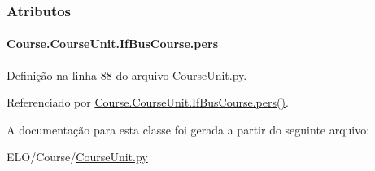 \subsubsection{Atributos}
\hypertarget{classCourse_1_1CourseUnit_1_1IfBusCourse_ab926ae8fb127b7697e2b63025df09a78}{
\paragraph[{pers}]{\setlength{\rightskip}{0pt plus 5cm}Course.\-Course\-Unit.\-If\-Bus\-Course.\-pers}}\label{classCourse_1_1CourseUnit_1_1IfBusCourse_ab926ae8fb127b7697e2b63025df09a78}


Definição na linha \hyperlink{CourseUnit_8py_source_l00088}{88} do arquivo \hyperlink{CourseUnit_8py_source}{Course\-Unit.\-py}.



Referenciado por \hyperlink{classCourse_1_1CourseUnit_1_1IfBusCourse_adf5702dec1a99bbb31936b7f1d425a40}{Course.\-Course\-Unit.\-If\-Bus\-Course.\-pers()}.



A documentação para esta classe foi gerada a partir do seguinte arquivo\-:\begin{DoxyCompactItemize}
\item 
E\-L\-O/\-Course/\hyperlink{CourseUnit_8py}{Course\-Unit.\-py}\end{DoxyCompactItemize}
